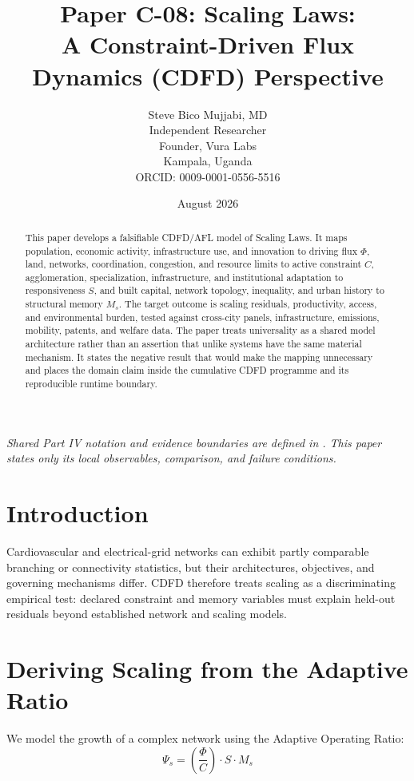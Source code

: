 \documentclass[11pt,a4paper]{article}
\title{\textbf{Paper C-08: Scaling Laws:\\ A Constraint-Driven Flux Dynamics (CDFD) Perspective}}
\author{Steve Bico Mujjabi, MD\\
\small Independent Researcher\\
\small Founder, Vura Labs\\
\small Kampala, Uganda\\
\small ORCID: 0009-0001-0556-5516}
\date{August 2026}
\begin{document}
\maketitle

\noindent\textit{Shared Part IV notation and evidence boundaries are defined in . This paper states only its local observables, comparison, and failure conditions.}


\begin{abstract}
This paper develops a falsifiable CDFD/AFL model of Scaling Laws. It maps population, economic activity, infrastructure use, and innovation to driving flux $\Phi$, land, networks, coordination, congestion, and resource limits to active constraint $C$, agglomeration, specialization, infrastructure, and institutional adaptation to responsiveness $S$, and built capital, network topology, inequality, and urban history to structural memory $M_s$. The target outcome is scaling residuals, productivity, access, and environmental burden, tested against cross-city panels, infrastructure, emissions, mobility, patents, and welfare data. The paper treats universality as a shared model architecture rather than an assertion that unlike systems have the same material mechanism. It states the negative result that would make the mapping unnecessary and places the domain claim inside the cumulative CDFD programme and its reproducible runtime boundary.
\end{abstract}

\section{Introduction}

Cardiovascular and electrical-grid networks can exhibit partly comparable branching or connectivity statistics, but their architectures, objectives, and governing mechanisms differ. CDFD therefore treats scaling as a discriminating empirical test: declared constraint and memory variables must explain held-out residuals beyond established network and scaling models.

\section{Deriving Scaling from the Adaptive Ratio}
We model the growth of a complex network using the Adaptive Operating Ratio:
\begin{equation}
    \Psi_s = \left( \frac{\Phi}{C} \right) \cdot S \cdot M_s
\end{equation}
\end{document}
